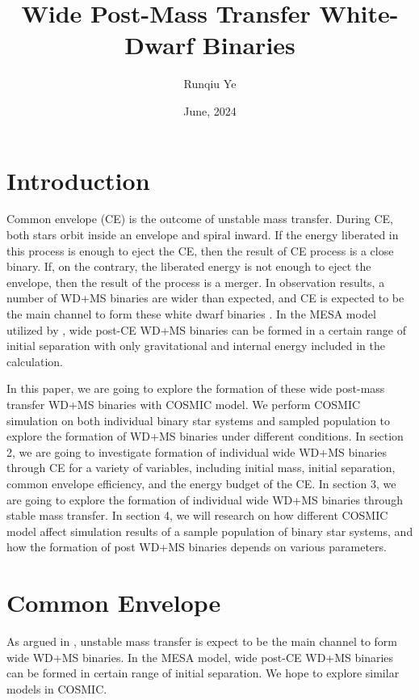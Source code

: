\documentclass[12pt]{article}
\title{Wide Post-Mass Transfer White-Dwarf Binaries}
\author{Runqiu Ye}
\date{June, 2024}
\begin{document}
\maketitle

\section{Introduction}
Common envelope (CE) is the outcome of unstable mass transfer. During CE, both stars orbit inside an envelope and spiral inward. If the energy liberated in this process is enough to eject the CE, then the result of CE process is a close binary. If, on the contrary, the liberated energy is not enough to eject the envelope, then the result of the process is a merger. In observation results, a number of WD+MS binaries are wider than expected, and CE is expected to be the main channel to form these white dwarf binaries \cite{yamaguchi_hi, yamaguchi_lo}. In the MESA model utilized by \cite{yamaguchi_hi, yamaguchi_lo}, wide post-CE WD+MS binaries can be formed in a certain range of initial separation with only gravitational and internal energy included in the calculation. 

In this paper, we are going to explore the formation of these wide post-mass transfer WD+MS binaries with COSMIC model. We perform COSMIC simulation on both individual binary star systems and sampled population to explore the formation of WD+MS binaries under different conditions. In section 2, we are going to investigate formation of individual wide WD+MS binaries through CE for a variety of variables, including initial mass, initial separation, common envelope efficiency, and the energy budget of the CE. In section 3, we are going to explore the formation of individual wide WD+MS binaries through stable mass transfer. In section 4, we will research on how different COSMIC model affect simulation results of a sample population of binary star systems, and how the formation of post WD+MS binaries depends on various parameters.

\section{Common Envelope}

As argued in \cite{yamaguchi_hi,yamaguchi_lo}, unstable mass transfer is expect to be the main channel to form wide WD+MS binaries. In the MESA model, wide post-CE WD+MS binaries can be formed in certain range of initial separation. We hope to explore similar models in COSMIC.
\end{document}
